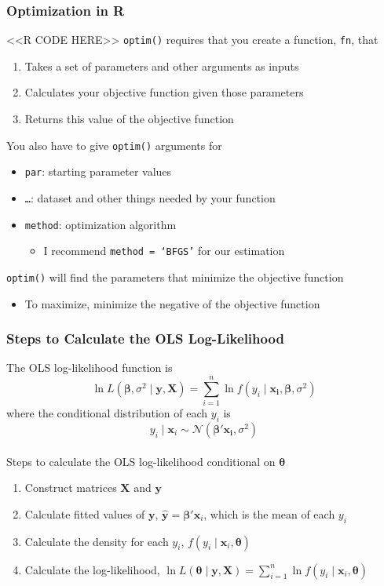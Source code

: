 \documentclass{beamer}
\begin{document}
\begin{frame}[fragile]\frametitle{Optimization in R}
    <<R CODE HERE>>
    \vspace{1ex}
    \texttt{optim()} requires that you create a function, \texttt{fn}, that
    \begin{enumerate}
        \item Takes a set of parameters and other arguments as inputs
        \item Calculates your objective function given those parameters
        \item Returns this value of the objective function
    \end{enumerate}
    \vspace{1ex}
    You also have to give \texttt{optim()} arguments for
    \begin{itemize}
        \item \texttt{par}: starting parameter values
        \item \texttt{\ldots}: dataset and other things needed by your function
        \item \texttt{method}: optimization algorithm
        \begin{itemize}
            \item I recommend \texttt{method = `BFGS'} for our estimation
        \end{itemize}
    \end{itemize}
    \vspace{1ex}
    \texttt{optim()} will find the parameters that minimize the objective function
    \begin{itemize}
        \item To maximize, minimize the negative of the objective function
    \end{itemize}
\end{frame}

\begin{frame}\frametitle{Steps to Calculate the OLS Log-Likelihood}
    The OLS log-likelihood function is
    $$\ln L(\bm{\beta}, \sigma^2 \mid \bm{y}, \bm{X}) = \sum_{i = 1}^n \ln f(y_i \mid \bm{x_i}, \bm{\beta}, \sigma^2)$$
    where the conditional distribution of each $y_i$ is
    $$y_i \mid \bm{x}_i \sim \mathcal{N}(\bm{\beta}' \bm{x_i}, \sigma^2)$$ \\
    \vspace{2ex}
    Steps to calculate the OLS log-likelihood conditional on $\bm{\theta}$
    \begin{enumerate}
        \item Construct matrices $\bm{X}$ and $\bm{y}$
        \item Calculate fitted values of $\bm{y}$, $\widehat{\bm{y}} = \bm{\beta}' \bm{x}_i$, which is the mean of each $y_i$
        \item Calculate the density for each $y_i$, $f(y_i \mid \bm{x}_i, \bm{\theta})$
        \item Calculate the log-likelihood, $\ln L(\bm{\theta} \mid \bm{y}, \bm{X}) = \sum_{i = 1}^n \ln f(y_i \mid \bm{x}_i, \bm{\theta})$
    \end{enumerate}
\end{frame}
\end{document}
